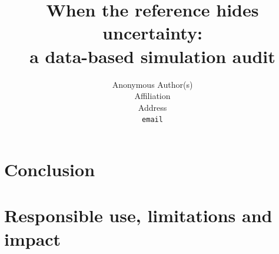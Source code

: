 \documentclass{article}
\title{When the reference hides uncertainty:\\
a data-based simulation audit}
\author{%
  Anonymous Author(s) \\
  Affiliation \\
  Address \\
  \texttt{email} \\
}
\begin{document}
\maketitle










\section{Conclusion}
\label{sec:conclusion}



\section{Responsible use, limitations and impact}
\label{sec:responsible}



\clearpage



\clearpage


\end{document}
